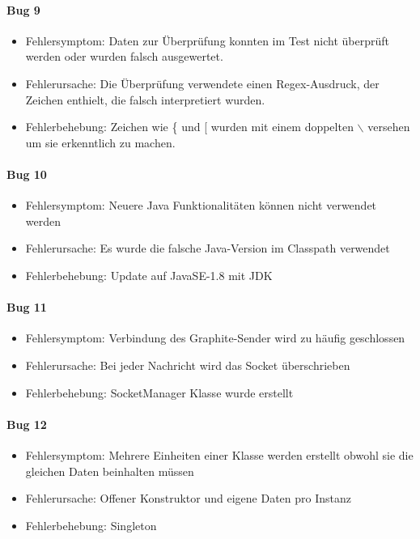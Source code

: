 \paragraph{Bug 9}
\begin{itemize}
	\item Fehlersymptom: Daten zur Überprüfung konnten im Test nicht überprüft werden oder wurden falsch ausgewertet.
	\item Fehlerursache: Die Überprüfung verwendete einen Regex-Ausdruck, der Zeichen enthielt, die falsch interpretiert wurden.
	\item Fehlerbehebung: Zeichen wie \{ und [ wurden mit einem doppelten $\backslash$ versehen um sie erkenntlich zu machen.
\end{itemize}

\paragraph{Bug 10}
\begin{itemize}
	\item Fehlersymptom: Neuere Java Funktionalitäten können nicht verwendet werden
	\item Fehlerursache: Es wurde die falsche Java-Version im Classpath verwendet
	\item Fehlerbehebung: Update auf JavaSE-1.8 mit JDK
\end{itemize}

\paragraph{Bug 11}
\begin{itemize}
	\item Fehlersymptom: Verbindung des Graphite-Sender wird zu häufig geschlossen
	\item Fehlerursache: Bei jeder Nachricht wird das Socket überschrieben
	\item Fehlerbehebung: SocketManager Klasse wurde erstellt
\end{itemize}

\paragraph{Bug 12}
\begin{itemize}
	\item Fehlersymptom: Mehrere Einheiten einer Klasse werden erstellt obwohl sie die gleichen Daten beinhalten müssen
	\item Fehlerursache: Offener Konstruktor und eigene Daten pro Instanz
	\item Fehlerbehebung: Singleton
\end{itemize}

